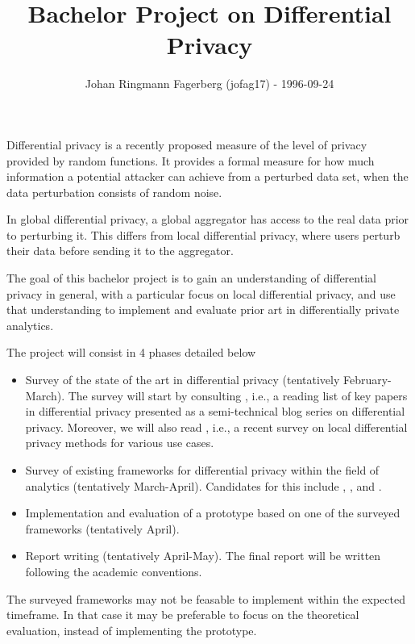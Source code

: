 \documentclass[a4paper]{article}
\title{\vspace{-2cm}Bachelor Project on Differential Privacy}
\author{Johan Ringmann Fagerberg (jofag17) - 1996-09-24}
\date{}
\begin{document}
\maketitle

\begin{description}[style=nextline]
    \item[Motivation] Differential privacy is a recently proposed measure of the level of privacy provided by random functions. It provides a formal measure for how much information a potential attacker can achieve from a perturbed data set, when the data perturbation consists of random noise.
    
    In global differential privacy, a global aggregator has access to the real data prior to perturbing it. This differs from local differential privacy, where users perturb their data before sending it to the aggregator.
    
    The goal of this bachelor project is to gain an understanding of 
differential privacy in general, with a particular focus on local differential 
privacy, and use that understanding to implement and evaluate prior art in differentially private analytics.

\item[Plan]
    The project will consist in 4 phases detailed below
    \begin{itemize}
     \item Survey of the state of the art in differential privacy (tentatively February-March). 
The survey will start by consulting \cite{desfontain_overview}, i.e., a reading 
list of key papers in differential privacy presented as a semi-technical blog 
series on differential privacy. Moreover, we will also read 
\cite{localdiffpriv_survey}, i.e., a recent survey on local differential privacy 
methods for various use cases.
     \item Survey of existing frameworks for differential privacy within the field of analytics (tentatively March-April).
Candidates for this include \cite{rappor}, \cite{prochlo}, \cite{multidimensional_localdiff} and \cite{microsoft_telemetry}.
     \item Implementation and evaluation of a prototype based on one of the surveyed frameworks (tentatively April).
     \item Report writing (tentatively April-May). The final report will be written 
following the academic conventions.
    \end{itemize}
    
\item[Risks] The surveyed frameworks may not be feasable to implement within the expected timeframe.
In that case it may be preferable to focus on the theoretical evaluation, instead of implementing the prototype.


\end{description}
\end{document}
